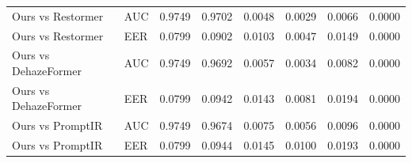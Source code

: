\begin{longtable}{llrrrrrr}
Ours vs Restormer & AUC & 0.9749 & 0.9702 & 0.0048 & 0.0029 & 0.0066 & 0.0000 \\
Ours vs Restormer & EER & 0.0799 & 0.0902 & 0.0103 & 0.0047 & 0.0149 & 0.0000 \\
Ours vs DehazeFormer & AUC & 0.9749 & 0.9692 & 0.0057 & 0.0034 & 0.0082 & 0.0000 \\
Ours vs DehazeFormer & EER & 0.0799 & 0.0942 & 0.0143 & 0.0081 & 0.0194 & 0.0000 \\
Ours vs PromptIR & AUC & 0.9749 & 0.9674 & 0.0075 & 0.0056 & 0.0096 & 0.0000 \\
Ours vs PromptIR & EER & 0.0799 & 0.0944 & 0.0145 & 0.0100 & 0.0193 & 0.0000 \\
\bottomrule
\end{longtable}

